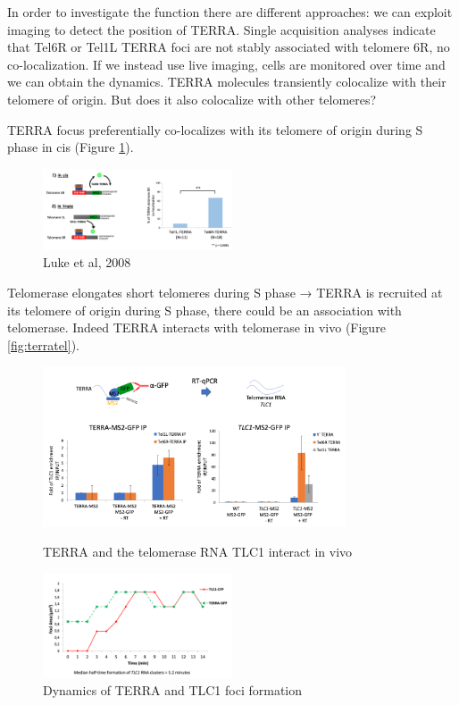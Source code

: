 In order to investigate the function there are different approaches: we
can exploit imaging to detect the position of TERRA. Single acquisition
analyses indicate that Tel6R or Tel1L TERRA foci are not stably
associated with telomere 6R, no co-localization. If we instead use live
imaging, cells are monitored over time and we can obtain the dynamics.
TERRA molecules transiently colocalize with their telomere of origin.
But does it also colocalize with other telomeres?

TERRA focus preferentially co-localizes with its telomere of origin
during S phase in cis (Figure \ref{fig:cis}).

\begin{figure}
\centering
\includegraphics[width=0.5\textwidth]{../_resources/Screen_Shot_2022-12-17_at_11-01-12.png}
\caption{Luke et al, 2008}
\label{fig:cis}
\end{figure}

Telomerase elongates short telomeres during S phase → TERRA is recruited
at its telomere of origin during S phase, there could be an association
with telomerase. Indeed TERRA interacts with telomerase in vivo (Figure \ref{fig:terratel}).

\begin{figure}[!htb]
   \begin{minipage}{0.48\textwidth}
     \centering
    \includegraphics[width=0.8\textwidth]{../_resources/Screen_Shot_2022-12-17_at_11-02-44.png}
\caption{TERRA and the telomerase RNA TLC1 interact in vivo}
\label{fig:terratel}
   \end{minipage}\hfill
   \begin{minipage}{0.48\textwidth}
     \centering
    \includegraphics[width=0.5\textwidth]{../_resources/Screen_Shot_2022-12-17_at_11-03-53.png}
\caption{Dynamics of TERRA and TLC1 foci formation}
\label{fig:terrafoci}
   \end{minipage}
\end{figure}

